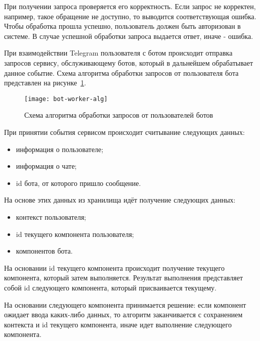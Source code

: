 При получении запроса проверяется его корректность.
Если запрос не корректен, например, такое обращение не доступно, то
выводится соответствующая ошибка. Чтобы обработка прошла успешно, пользователь
должен быть авторизован в системе. В случае успешной обработки запроса выдается
ответ, иначе - ошибка.


При взаимодействии Telegram пользователя с ботом происходит
отправка запросов сервису, обслуживающему ботов, который в дальнейшем
обрабатывает данное событие. Схема алгоритма обработки запросов от
пользователя бота представлен на рисунке~\ref{f:bot-worker-alg}.


\begin{figure}[hp]
	\centering
	\texttt{[image: bot-worker-alg]}
	\caption{Схема алгоритма обработки запросов от пользователей ботов}
	\label{f:bot-worker-alg}
\end{figure}

При принятии события сервисом происходит считывание следующих
данных:
\begin{itemize}
	\item информация о пользователе;
	\item информация о чате;
	\item id бота, от которого пришло сообщение.
\end{itemize}

На основе этих данных из хранилища идёт получение следующих
данных:
\begin{itemize}
	\item контекст пользователя;
	\item id текущего компонента пользователя;
	\item компонентов бота.
\end{itemize}

На основании id текущего компонента происходит получение текущего
компонента, который затем выполняется. Результат выполнения представляет
собой id следующего компонента, который присваивается текущему.

На основании следующего компонента принимается решение: если
компонент ожидает ввода каких-либо данных, то алгоритм заканчивается с
сохранением контекста и id текущего компонента, иначе идет выполнение
следующего компонента.

\newpage


